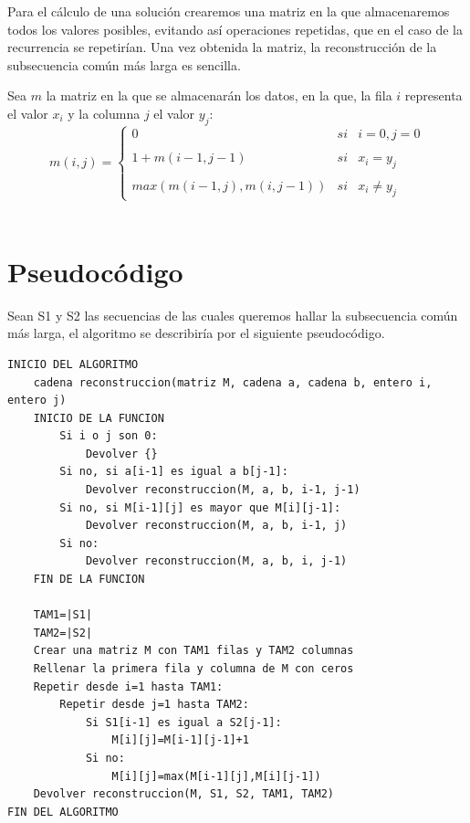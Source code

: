 \documentclass[11pt,a4paper]{article} %
\begin{document}
Para el cálculo de una solución crearemos una matriz en la que almacenaremos todos los valores posibles, evitando así operaciones repetidas, que en el caso de la recurrencia se repetirían.
Una vez obtenida la matriz, la reconstrucción de la subsecuencia común más larga es sencilla.

Sea $m$ la matriz en la que se almacenarán los datos, en la que, la fila $i$ representa el valor $x_i$ y la columna $j$ el valor $y_j$:
$$
m(i, j)= \left\{ \begin{array}{lcc}
	0 &   si  & i = 0, j = 0\\
	\\ 1 + m(i-1, j-1) &  si & x_i = y_j \\
	\\ max(m(i-1,j), m(i,j-1)) &  si  & x_i \neq y_j
	\end{array}
\right.
$$
\\

\newpage
\section{Pseudocódigo}
Sean S1 y S2 las secuencias de las cuales queremos hallar la subsecuencia común más larga, el algoritmo se describiría por el siguiente pseudocódigo.

\small
{}
\normalsize 	
\begin{lstlisting}
INICIO DEL ALGORITMO
    cadena reconstruccion(matriz M, cadena a, cadena b, entero i, entero j)
    INICIO DE LA FUNCION
        Si i o j son 0:
            Devolver {}
        Si no, si a[i-1] es igual a b[j-1]:
            Devolver reconstruccion(M, a, b, i-1, j-1)
        Si no, si M[i-1][j] es mayor que M[i][j-1]:
            Devolver reconstruccion(M, a, b, i-1, j)
        Si no:
            Devolver reconstruccion(M, a, b, i, j-1)
    FIN DE LA FUNCION
    
    TAM1=|S1|
    TAM2=|S2|
    Crear una matriz M con TAM1 filas y TAM2 columnas
    Rellenar la primera fila y columna de M con ceros
    Repetir desde i=1 hasta TAM1:
        Repetir desde j=1 hasta TAM2:
            Si S1[i-1] es igual a S2[j-1]:
                M[i][j]=M[i-1][j-1]+1
            Si no:
                M[i][j]=max(M[i-1][j],M[i][j-1])
    Devolver reconstruccion(M, S1, S2, TAM1, TAM2)
FIN DEL ALGORITMO

\end{lstlisting}
\end{document}
